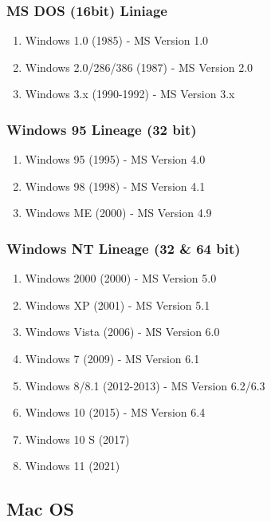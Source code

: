 \subsubsection{MS DOS (16bit) Liniage}

\begin{enumerate}
    \item Windows 1.0 (1985) - MS Version 1.0
    \item Windows 2.0/286/386 (1987) - MS Version 2.0
    \item Windows 3.x (1990-1992) - MS Version 3.x
\end{enumerate}

\subsubsection{Windows 95 Lineage (32 bit)}

\begin{enumerate}
    \item Windows 95 (1995) - MS Version 4.0
    \item Windows 98 (1998) - MS Version 4.1
    \item Windows ME (2000) - MS Version 4.9
\end{enumerate}

\subsubsection{Windows NT Lineage (32 \& 64 bit)}

\begin{enumerate}
    \item Windows 2000 (2000) - MS Version 5.0
    \item Windows XP (2001) - MS Version 5.1
    \item Windows Vista (2006) - MS Version 6.0
    \item Windows 7 (2009) - MS Version 6.1
    \item Windows 8/8.1 (2012-2013) - MS Version 6.2/6.3
    \item Windows 10 (2015) - MS Version 6.4
    \item Windows 10 S (2017)
    \item Windows 11 (2021)
\end{enumerate}

\newpage
\subsection{Mac OS}

